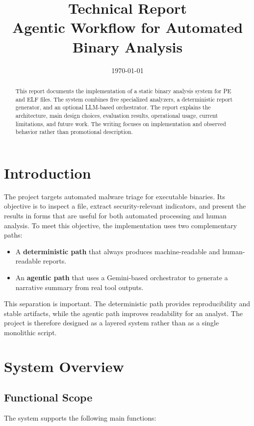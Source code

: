 \documentclass[11pt,a4paper]{article}
\title{\Huge\bfseries\color{primary} Technical Report\\[0.5ex] \Large Agentic Workflow for Automated Binary Analysis}
\author{}
\date{\today}
\begin{document}
\maketitle
\vspace{-3em}

\begin{abstract}
\noindent This report documents the implementation of a static binary analysis system for PE and ELF files. The system combines five specialized analyzers, a deterministic report generator, and an optional LLM-based orchestrator. The report explains the architecture, main design choices, evaluation results, operational usage, current limitations, and future work. The writing focuses on implementation and observed behavior rather than promotional description.
\end{abstract}

\section{Introduction}
The project targets automated malware triage for executable binaries. Its objective is to inspect a file, extract security-relevant indicators, and present the results in forms that are useful for both automated processing and human analysis. To meet this objective, the implementation uses two complementary paths:

\begin{itemize}
\item A \textbf{deterministic path} that always produces machine-readable and human-readable reports.
\item An \textbf{agentic path} that uses a Gemini-based orchestrator to generate a narrative summary from real tool outputs.
\end{itemize}

This separation is important. The deterministic path provides reproducibility and stable artifacts, while the agentic path improves readability for an analyst. The project is therefore designed as a layered system rather than as a single monolithic script.

\section{System Overview}
\subsection{Functional Scope}
The system supports the following main functions:
\end{document}
